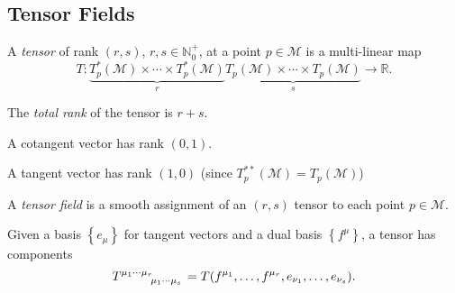 \subsection{Tensor Fields}%
\label{sub:tensor_fields}

\begin{definition}[tensor]
  A \emph{tensor} of rank $(r, s)$, $r, s \in \mathbb{N}_0^+$, at a point $p \in \mathcal{M}$ is a multi-linear map
  \begin{equation}
    T: \underbrace{T^*_p(\mathcal{M}) \times \cdots \times T_p^*(\mathcal{M})}_{r}
    \underbrace{T_p(\mathcal{M}) \times \cdots \times T_p(\mathcal{M})}_{s}
    \to \mathbb{R}.
  \end{equation}
\end{definition}

\begin{definition}[rank]
  The \emph{total rank} of the tensor is $r + s$.
\end{definition}

\begin{example}[]
  A cotangent vector has rank $(0, 1)$.\par
  A tangent vector has rank $(1, 0)$ (since $T^{**}_p(\mathcal{M}) = T_p(\mathcal{M})$)
\end{example}

\begin{definition}
  A \emph{tensor field} is a smooth assignment of an $(r, s)$ tensor to each point $p \in \mathcal{M}$.
\end{definition}

\begin{claim}
  Given a basis $\left\{ e_\mu \right\}$ for tangent vectors and a dual basis $\left\{ f^\mu \right\}$, a tensor has components
  \begin{equation}
    T \indices{^{\mu_1 \cdots \mu_r}_{\mu_1 \cdots \mu_s}} = T(f^{\mu_1}, \ldots, f^{\mu_r}, e_{\nu_1}, \ldots, e_{\nu_s}).
  \end{equation}
\end{claim}
